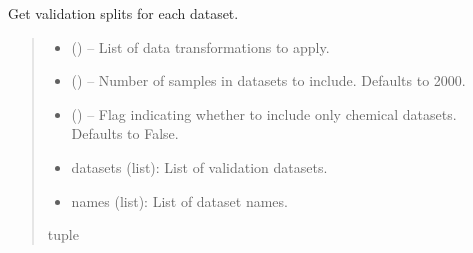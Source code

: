 \documentclass[letterpaper,10pt,english]{sphinxhowto}
\begin{document}

\begin{fulllineitems}
\label{\detokenize{datasets/loaders:datasets.loaders.get_val_datasets}}
\pysigstartsignatures
{}
\pysigstopsignatures
\sphinxAtStartPar
Get validation splits for each dataset.
\begin{quote}\begin{description}
\begin{itemize}
\item {} 
\sphinxAtStartPar
{} () – List of data transformations to apply.

\item {} 
\sphinxAtStartPar
{} (\sphinxstyleliteralemphasis{\sphinxupquote{, }}) – Number of samples in datasets to include. Defaults to 2000.

\item {} 
\sphinxAtStartPar
{} (\sphinxstyleliteralemphasis{\sphinxupquote{, }}) – Flag indicating whether to include only chemical datasets. Defaults to False.

\end{itemize}

\sphinxAtStartPar
\begin{description}
\begin{itemize}
\item {} 
\sphinxAtStartPar
datasets (list): List of validation datasets.

\item {} 
\sphinxAtStartPar
names (list): List of dataset names.

\end{itemize}

\end{description}


\sphinxAtStartPar
tuple

\end{description}\end{quote}

\end{fulllineitems}
\end{document}
